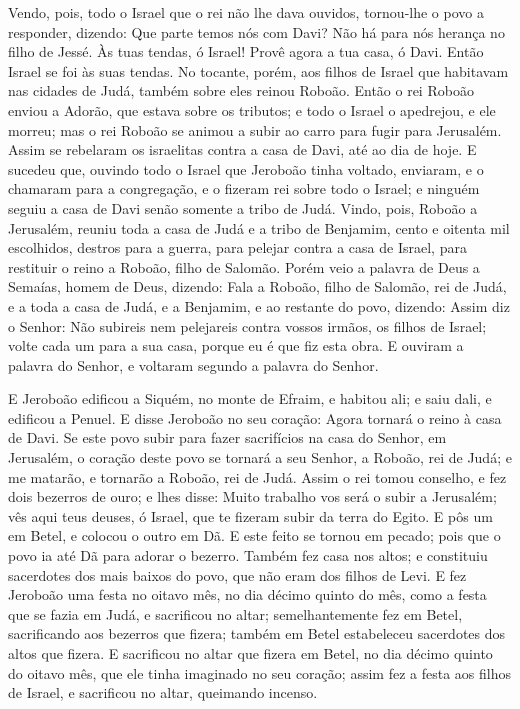 Vendo, pois, todo o Israel que o rei não lhe dava ouvidos,
tornou-lhe o povo a responder, dizendo: Que parte temos nós com
Davi? Não há para nós herança no filho de Jessé. Às tuas tendas, ó
Israel! Provê agora a tua casa, ó Davi. Então Israel se foi às suas
tendas. No tocante, porém, aos filhos de Israel que habitavam
nas cidades de Judá, também sobre eles reinou Roboão. Então o
rei Roboão enviou a Adorão, que estava sobre os tributos; e todo o
Israel o apedrejou, e ele morreu; mas o rei Roboão se animou a subir
ao carro para fugir para Jerusalém. Assim se rebelaram os
israelitas contra a casa de Davi, até ao dia de hoje. E
sucedeu que, ouvindo todo o Israel que Jeroboão tinha voltado,
enviaram, e o chamaram para a congregação, e o fizeram rei sobre
todo o Israel; e ninguém seguiu a casa de Davi senão somente a tribo
de Judá. Vindo, pois, Roboão a Jerusalém, reuniu toda a casa
de Judá e a tribo de Benjamim, cento e oitenta mil escolhidos,
destros para a guerra, para pelejar contra a casa de Israel, para
restituir o reino a Roboão, filho de Salomão. Porém veio a
palavra de Deus a Semaías, homem de Deus, dizendo: Fala a
Roboão, filho de Salomão, rei de Judá, e a toda a casa de Judá, e a
Benjamim, e ao restante do povo, dizendo: Assim diz o Senhor:
Não subireis nem pelejareis contra vossos irmãos, os filhos de
Israel; volte cada um para a sua casa, porque eu é que fiz esta
obra. E ouviram a palavra do Senhor, e voltaram segundo a palavra do
Senhor.

E Jeroboão edificou a Siquém, no monte de Efraim, e habitou ali;
e saiu dali, e edificou a Penuel. E disse Jeroboão no seu
coração: Agora tornará o reino à casa de Davi. Se este povo
subir para fazer sacrifícios na casa do Senhor, em Jerusalém, o
coração deste povo se tornará a seu Senhor, a Roboão, rei de Judá; e
me matarão, e tornarão a Roboão, rei de Judá. Assim o rei
tomou conselho, e fez dois bezerros de ouro; e lhes disse: Muito
trabalho vos será o subir a Jerusalém; vês aqui teus deuses, ó
Israel, que te fizeram subir da terra do Egito. E pôs um em
Betel, e colocou o outro em Dã. E este feito se tornou em
pecado; pois que o povo ia até Dã para adorar o bezerro.
Também fez casa nos altos; e constituiu sacerdotes dos mais
baixos do povo, que não eram dos filhos de Levi. E fez
Jeroboão uma festa no oitavo mês, no dia décimo quinto do mês, como
a festa que se fazia em Judá, e sacrificou no altar; semelhantemente
fez em Betel, sacrificando aos bezerros que fizera; também em Betel
estabeleceu sacerdotes dos altos que fizera. E sacrificou no
altar que fizera em Betel, no dia décimo quinto do oitavo mês, que
ele tinha imaginado no seu coração; assim fez a festa aos filhos de
Israel, e sacrificou no altar, queimando incenso.

